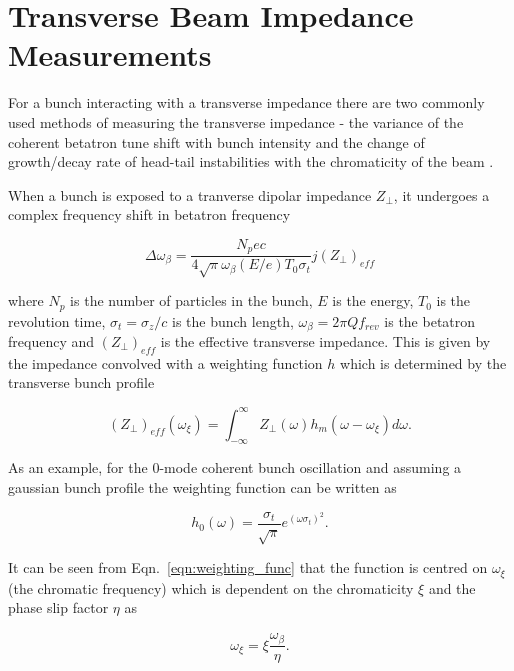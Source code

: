 \section{Transverse Beam Impedance Measurements}


For a bunch interacting with a transverse impedance there are two commonly used methods of measuring the transverse impedance - the variance of the coherent betatron tune shift with bunch intensity and the change of growth/decay rate of head-tail instabilities with the chromaticity of the beam \cite{Sacherer:BunchBeamEffects}.

When a bunch is exposed to a tranverse dipolar impedance $Z_{\perp}$, it undergoes a complex frequency shift in betatron frequency


\begin{equation}
\Delta{}\omega_{\beta} = \frac{N_{p}ec}{4\sqrt{\pi}\omega_{\beta} \left( E/e \right)T_{0}\sigma_{t}} j\left( Z_{\perp} \right)_{eff}
\label{eqn:complex_tun_shift}
\end{equation}

where $N_{p}$ is the number of particles in the bunch, $E$ is the energy, $T_{0}$ is the revolution time, $\sigma_{t} = \sigma_{z}/c$ is the bunch length, $\omega_{\beta} = 2\pi{}Q f_{rev}$ is the betatron frequency and $\left( Z_{\perp} \right)_{eff}$ is the effective transverse impedance. This is given by the impedance convolved with a weighting function $h$ which is determined by the transverse bunch profile

\begin{equation}
\left( Z_{\perp} \right)_{eff} \left( \omega_{\xi} \right) = \int_{-\infty}^{\infty} Z_{\perp} \left( \omega \right) h_{m} \left(  \omega - \omega_{\xi} \right) d\omega.
\end{equation}

As an example, for the 0-mode coherent bunch oscillation and assuming a gaussian bunch profile the weighting function can be written as

\begin{equation}
h_{0} \left( \omega \right) = \frac{\sigma_{t}}{\sqrt{\pi}}e^{ \left(  \omega \sigma_{t}  \right)^{2}}.
\label{eqn:weighting_func}
\end{equation}

It can be seen from Eqn.~\ref{eqn:weighting_func} that the function is centred on $\omega_{\xi}$ (the chromatic frequency) which is dependent on the chromaticity $\xi$ and the phase slip factor $\eta$ as

\begin{equation}
\omega_{\xi} = \xi \frac{\omega_{\beta}}{\eta}.
\end{equation}

